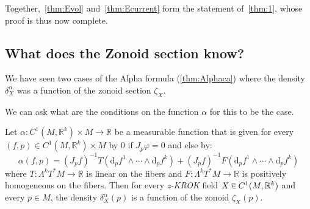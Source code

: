 \documentclass[10pt]{amsart}
\theoremstyle{definition}\newtheorem{defi}[theo]{Definition}\newtheorem{rema}[theo]{Remark}\newtheorem{exam}[theo]{Example}\newtheorem{exem}[theo]{Example}\newtheorem{nota}[theo]{Notation}
\newcommand{\R}{\mathbb{R}}
\newcommand{\dd}{\mathrm{d}}
\newcommand{\zkrok}{\emph{z-KROK}\xspace}
\newcommand*\randin{
\mathchoice {\raisebox{-.35ex}{$\displaystyle{^\subset}$}\mkern-11.5mu\raisebox{+.45ex}{$\displaystyle{_\subset}$}} {\mkern+1mu\raisebox{-.27ex}{$\textstyle{^\subset}$}\mkern-11.7mu\raisebox{+.45ex}{$\textstyle{_\subset}$}} {\raisebox{.35ex}{$\scriptstyle\subset$}\mkern-14mu\raisebox{-.15ex}{$\scriptstyle\subset$}} {\raisebox{.3ex}{$\scriptscriptstyle\subset$}\mkern-13.5mu\raisebox{-.10ex}{$\scriptscriptstyle\subset$}}}
\begin{document}
Together,~\cref{thm:Evol} and~\cref{thm:Ecurrent} form the statement of~\cref{thm:1}, whose proof is thus now complete.

\subsection{What does the Zonoid section know?}\label{sub:whatdoesitknow}
We have seen two cases of the Alpha formula (\cref{thm:Alphaca}) where the density $\delta^\alpha_X$ was a function of the zonoid section $\zeta_X$.

We can ask what are the conditions on the function $\alpha$ for this to be the case.

\begin{prop}\label{prop:whatknows}
Let $\alpha:C^1(M,\R^k)\times M\to \R$ be a measurable function that is given for every $(f,p)\in C^1(M,\R^k)\times M$ by $0$ if $J_p\varphi=0$ and else by:
\begin{equation}
\alpha(f,p)= (J_pf)^{-1}T\left(\dd_pf^1\wedge \cdots\wedge \dd_pf^k\right)+(J_pf)^{-1}F\left(\dd_pf^1\wedge \cdots\wedge \dd_pf^k\right)
\end{equation}
where $T:\Lambda^kT^*M\to \R$ is linear on the fibers and $F:\Lambda^kT^*M\to \R$ is positively homogeneous on the fibers. Then for every \zkrok field $X\,\randin\, C^1(M,\R^k)$ and every $p\in M$, the density $\delta_X^\alpha(p)$ is a function of the zonoid $\zeta_X(p)$.
\end{prop}
\end{document}
